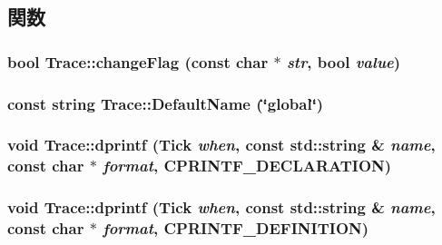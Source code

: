 \subsection{関数}
\hypertarget{namespaceTrace_a0906ddd3d2ff2195baef2184cd546aa3}{
\subsubsection[{changeFlag}]{\setlength{\rightskip}{0pt plus 5cm}bool Trace::changeFlag (const char $\ast$ {\em str}, \/  bool {\em value})}}
\label{namespaceTrace_a0906ddd3d2ff2195baef2184cd546aa3}
\hypertarget{namespaceTrace_a8606dda8a833927860293af0c77f06a4}{
\subsubsection[{DefaultName}]{\setlength{\rightskip}{0pt plus 5cm}const string {\bf Trace::DefaultName} (\char`\"{}global\char`\"{})}}
\label{namespaceTrace_a8606dda8a833927860293af0c77f06a4}
\hypertarget{namespaceTrace_abeb8fab1f3446f7c844c2770dab2c616}{
\subsubsection[{dprintf}]{\setlength{\rightskip}{0pt plus 5cm}void Trace::dprintf ({\bf Tick} {\em when}, \/  const std::string \& {\em name}, \/  const char $\ast$ {\em format}, \/  CPRINTF\_\-DECLARATION)}}
\label{namespaceTrace_abeb8fab1f3446f7c844c2770dab2c616}
\hypertarget{namespaceTrace_a06c3e4f91b64a7d89d659141b272bccc}{
\subsubsection[{dprintf}]{\setlength{\rightskip}{0pt plus 5cm}void Trace::dprintf ({\bf Tick} {\em when}, \/  const std::string \& {\em name}, \/  const char $\ast$ {\em format}, \/  CPRINTF\_\-DEFINITION)}}
\label{namespaceTrace_a06c3e4f91b64a7d89d659141b272bccc}




